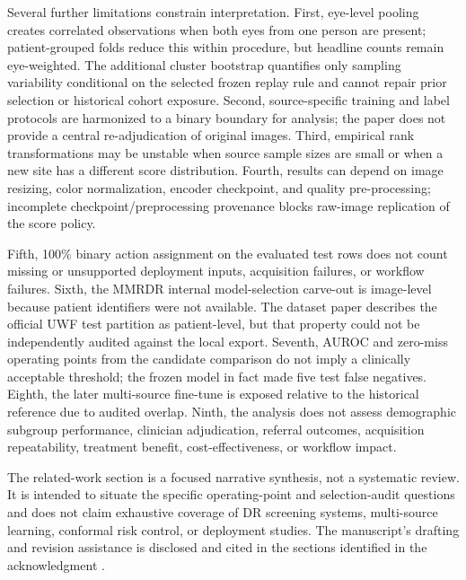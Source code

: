 \documentclass{ieeeaccess}
\begin{document}
Several further limitations constrain interpretation. First, eye-level pooling creates correlated observations when both eyes from one person are present; patient-grouped folds reduce this within procedure, but headline counts remain eye-weighted. The additional cluster bootstrap quantifies only sampling variability conditional on the selected frozen replay rule and cannot repair prior selection or historical cohort exposure. Second, source-specific training and label protocols are harmonized to a binary boundary for analysis; the paper does not provide a central re-adjudication of original images. Third, empirical rank transformations may be unstable when source sample sizes are small or when a new site has a different score distribution. Fourth, results can depend on image resizing, color normalization, encoder checkpoint, and quality pre-processing; incomplete checkpoint/preprocessing provenance blocks raw-image replication of the score policy.

Fifth, 100\% binary action assignment on the evaluated test rows does not count missing or unsupported deployment inputs, acquisition failures, or workflow failures. Sixth, the MMRDR internal model-selection carve-out is image-level because patient identifiers were not available. The dataset paper describes the official UWF test partition as patient-level, but that property could not be independently audited against the local export. Seventh, AUROC and zero-miss operating points from the candidate comparison do not imply a clinically acceptable threshold; the frozen model in fact made five test false negatives. Eighth, the later multi-source fine-tune is exposed relative to the historical reference due to audited overlap. Ninth, the analysis does not assess demographic subgroup performance, clinician adjudication, referral outcomes, acquisition repeatability, treatment benefit, cost-effectiveness, or workflow impact.

The related-work section is a focused narrative synthesis, not a systematic review. It is intended to situate the specific operating-point and selection-audit questions and does not claim exhaustive coverage of DR screening systems, multi-source learning, conformal risk control, or deployment studies. The manuscript's drafting and revision assistance is disclosed and cited in the sections identified in the acknowledgment \cite{openaiChatGPT}.
\end{document}
